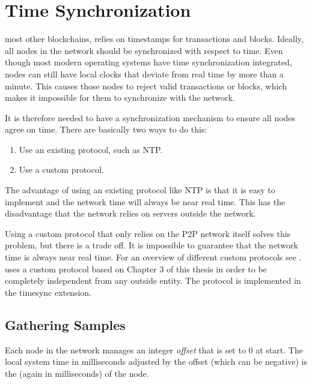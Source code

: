 \section{Time Synchronization}
\label{sec:timesync}


 most other blockchains, \codenamespace relies on timestamps for transactions and blocks.
Ideally, all nodes in the network should be synchronized with respect to time.
Even though most modern operating systems have time synchronization integrated,
nodes can still have local clocks that deviate from real time by more than a minute.
This causes those nodes to reject valid transactions or blocks, which makes it impossible for them to synchronize with the network.

It is therefore needed to have a synchronization mechanism to ensure all nodes agree on time.
There are basically two ways to do this:
\begin{enumerate}
	\item{Use an existing protocol, such as NTP.}
	\item{Use a custom protocol.}
\end{enumerate}

The advantage of using an existing protocol like NTP is that it is easy to implement and the network time will always be near real time.
This has the disadvantage that the network relies on servers outside the network.

Using a custom protocol that only relies on the P2P network itself solves this problem, but there is a trade off.
It is impossible to guarantee that the network time is always near real time.
For an overview of different custom protocols see \cite{Scipioni2009}.
\codenamespace uses a custom protocol based on Chapter 3 of this thesis in order to be completely independent from any outside entity.
The protocol is implemented in the timesync extension.

\subsection{Gathering Samples}

Each node in the network manages an integer \emph{offset} that is set to 0 at start.
The local system time in milliseconds adjusted by the offset (which can be negative) is the  (again in milliseconds) of the node.

